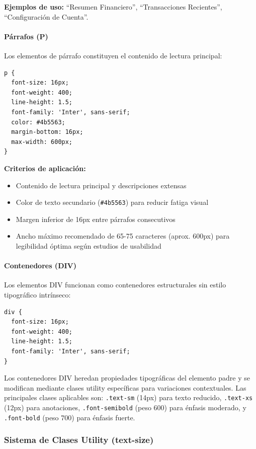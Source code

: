 \documentclass[12pt,a4paper,oneside]{article}
\begin{document}
\textbf{Ejemplos de uso:} ``Resumen Financiero'', ``Transacciones Recientes'', ``Configuración de Cuenta''.

\paragraph{Párrafos (P)}
Los elementos de párrafo constituyen el contenido de lectura principal:

\begin{verbatim}
p {
  font-size: 16px;
  font-weight: 400;
  line-height: 1.5;
  font-family: 'Inter', sans-serif;
  color: #4b5563;
  margin-bottom: 16px;
  max-width: 600px;
}
\end{verbatim}

\textbf{Criterios de aplicación:}
\begin{itemize}
    \item Contenido de lectura principal y descripciones extensas
    \item Color de texto secundario (\texttt{\#4b5563}) para reducir fatiga visual
    \item Margen inferior de 16px entre párrafos consecutivos
    \item Ancho máximo recomendado de 65-75 caracteres (aprox. 600px) para legibilidad óptima según estudios de usabilidad
\end{itemize}

\paragraph{Contenedores (DIV)}
Los elementos DIV funcionan como contenedores estructurales sin estilo tipográfico intrínseco:

\begin{verbatim}
div {
  font-size: 16px;
  font-weight: 400;
  line-height: 1.5;
  font-family: 'Inter', sans-serif;
}
\end{verbatim}

Los contenedores DIV heredan propiedades tipográficas del elemento padre y se modifican mediante clases utility específicas para variaciones contextuales. Las principales clases aplicables son: \texttt{.text-sm} (14px) para texto reducido, \texttt{.text-xs} (12px) para anotaciones, \texttt{.font-semibold} (peso 600) para énfasis moderado, y \texttt{.font-bold} (peso 700) para énfasis fuerte.

\subsubsection{Sistema de Clases Utility (text-size)}
\end{document}
